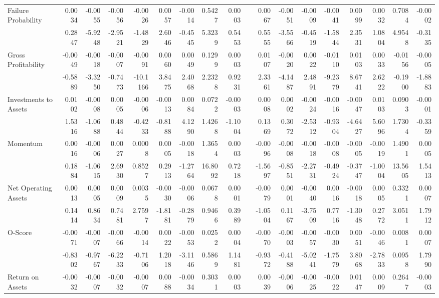 \begin{table}[h]
{\begin{tabular}{lrrrrrrrrrrrrrrrrr}
Failure Probability & 0.0034 & -0.0055 & -0.0056 & -0.0026 & 0.0057 & -0.0014 & 0.5427 & 0.0003 &       & 0.0067 & -0.0051 & -0.0009 & -0.0041 & 0.0099 & 0.0032 & 0.7084 & -0.0002 \\
& 0.2847 & -5.9248 & -2.9521 & -1.4829 & 2.6046 & -0.4545 & 5.3239 & 0.5453 &       & 0.5555 & -3.5566 & -0.4519 & -1.5844 & 2.3531 & 1.0804 & 4.9548 & -0.3135 \\
Gross Profitability & -0.0049 & -0.0018 & -0.0007 & -0.0091 & 0.0060 & 0.0049 & 0.1299 & 0.0003 &       & 0.0107 & -0.0020 & 0.0022 & -0.0110 & 0.0103 & 0.0033 & -0.0156 & -0.0005 \\
& -0.5889 & -3.3250 & -0.7473 & -10.1166 & 3.8475 & 2.4068 & 2.2328 & 0.9231 &       & 2.3361 & -4.1487 & 2.4891 & -9.2379 & 8.6741 & 2.6222 & -0.1900 & -1.8883 \\
Investments to Assets & 0.0102 & -0.0008 & 0.0005 & -0.0006 & -0.0013 & 0.0084 & 0.0722 & -0.0003 &       & 0.0008 & 0.0002 & -0.0024 & -0.0016 & -0.0047 & 0.0103 & 0.0903 & -0.0001 \\
& 1.5316 & -1.0688 & 0.4844 & -0.4233 & -0.8188 & 4.1290 & 1.4268 & -1.1004 &       & 0.1369 & 0.3072 & -2.5312 & -0.9304 & -4.6427 & 5.6096 & 1.7304 & -0.3359 \\
Momentum & 0.0016 & -0.0006 & 0.0027 & 0.0008 & 0.0005 & -0.0018 & 1.3654 & 0.0003 &       & -0.0096 & -0.0008 & -0.0018 & -0.0008 & -0.0005 & -0.0019 & 1.4901 & 0.0005 \\
& 0.1884 & -1.0615 & 2.6930 & 0.8527 & 0.2913 & -1.2764 & 16.8092 & 0.7218 &       & -1.5697 & -0.8551 & -2.2731 & -0.4924 & -0.3747 & -1.0004 & 13.5605 & 1.5413 \\
Net Operating Assets & 0.0013 & 0.0005 & 0.0009 & 0.0035 & -0.0030 & -0.0006 & 0.0678 & 0.0001 &       & -0.0079 & 0.0001 & -0.0040 & 0.0016 & -0.0018 & 0.0005 & 0.3321 & 0.0007 \\
& 0.1414 & 0.8634 & 0.7481 & 2.7597 & -1.8181 & -0.2879 & 0.9466 & 0.3989 &       & -1.0504 & 0.1167 & -3.7509 & 0.7716 & -1.3048 & 0.2772 & 3.0511 & 1.7912 \\
O-Score & -0.0071 & -0.0007 & -0.0066 & -0.0014 & 0.0022 & -0.0053 & 0.0252 & 0.0004 &       & -0.0070 & -0.0003 & -0.0057 & -0.0030 & 0.0051 & -0.0046 & 0.0081 & 0.0007 \\
& -0.8302 & -0.9767 & -6.2233 & -0.7106 & 1.2018 & -3.1146 & 0.5869 & 1.1481 &       & -0.9372 & -0.4188 & -5.0241 & -1.7579 & 3.8068 & -2.7833 & 0.0958 & 1.7990 \\
Return on Assets & -0.0032 & -0.0007 & -0.0032 & -0.0007 & 0.0088 & -0.0034 & 0.3031 & 0.0003 &       & 0.0039 & -0.0006 & -0.0025 & -0.0022 & 0.0147 & 0.0009 & 0.2647 & -0.0003 \\

\end{tabular}}
\end{table}
